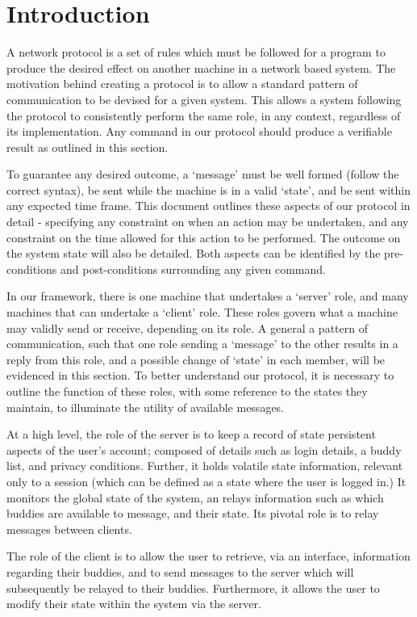 \section{Introduction}

A network protocol is a set of rules which must be followed for a program to produce the desired effect on another machine in a network based system. The motivation behind creating a protocol is to allow a standard pattern of communication to be devised for a given system. This allows a system following the protocol to consistently perform the same role, in any context, regardless of its implementation. Any command in our protocol should produce a verifiable result as outlined in this section.

To guarantee any desired outcome, a ‘message’ must be well formed (follow the correct syntax), be sent while the machine is in a valid ‘state’, and be sent within any expected time frame. This document outlines these aspects of our protocol in detail - specifying any constraint on when an action may be undertaken, and any constraint on the time allowed for this action to be performed. The outcome on the system state will also be detailed. Both aspects can be identified by the pre-conditions and post-conditions surrounding any given command.

In our framework, there is one machine that undertakes a ‘server’ role, and many machines that can undertake a ‘client’ role. These roles govern what a machine may validly send or receive, depending on its role. A general a pattern of communication, such that one role sending a ‘message’ to the other results in a reply from this role, and a possible change of ‘state’ in each member, will be evidenced in this section. To better understand our protocol, it is  necessary to outline the function of these roles, with some reference to the states they maintain, to illuminate the utility of available messages.

At a high level, the role of the server is to keep a record of state persistent aspects of the user’s account; composed of details such as login details, a buddy list, and privacy conditions. Further, it holds volatile state information, relevant only to a session (which can be defined as a state where the user is logged in.) It monitors the global state of the system, an relays information such as which buddies are available to message, and their state. Its pivotal role is to relay messages between clients. 

The role of the client is to allow the user to retrieve, via an interface, information regarding their buddies, and to send messages to the server which will subsequently be relayed to their buddies. Furthermore, it allows the user to modify their state within the system via the server.

